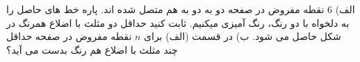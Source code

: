 \exercise
الف)
$6$
نقطه مفروض در صفحه دو به دو به هم متصل شده اند. پاره خط های حاصل را به دلخواه با دو رنگ، رنگ آمیزی میکنیم. ثابت کنید حداقل دو مثلث با اضلاع همرنگ در شکل حاصل می شود.
ب) در قسمت (الف) برای
$n$
نقطه مفروض در صفحه حداقل چند مثلث با اضلاع هم رنگ بدست می آید؟
